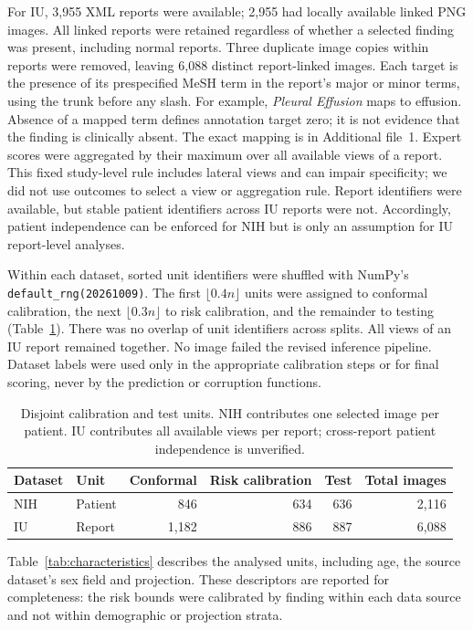\documentclass[10pt,a4paper]{article}
\begin{document}
For IU, 3,955 XML reports were available; 2,955 had locally available linked PNG images. All linked reports were retained regardless of whether a selected finding was present, including normal reports. Three duplicate image copies within reports were removed, leaving 6,088 distinct report-linked images. Each target is the presence of its prespecified MeSH term in the report's major or minor terms, using the trunk before any slash. For example, \emph{Pleural Effusion} maps to effusion. Absence of a mapped term defines annotation target zero; it is not evidence that the finding is clinically absent. The exact mapping is in Additional file~1. Expert scores were aggregated by their maximum over all available views of a report. This fixed study-level rule includes lateral views and can impair specificity; we did not use outcomes to select a view or aggregation rule. Report identifiers were available, but stable patient identifiers across IU reports were not. Accordingly, patient independence can be enforced for NIH but is only an assumption for IU report-level analyses.

Within each dataset, sorted unit identifiers were shuffled with NumPy's \texttt{default\_rng(20261009)}. The first $\lfloor0.4n\rfloor$ units were assigned to conformal calibration, the next $\lfloor0.3n\rfloor$ to risk calibration, and the remainder to testing (Table~\ref{tab:cohort}). There was no overlap of unit identifiers across splits. All views of an IU report remained together. No image failed the revised inference pipeline. Dataset labels were used only in the appropriate calibration steps or for final scoring, never by the prediction or corruption functions.

\begin{table}[htbp]
\centering\small
\caption{Disjoint calibration and test units. NIH contributes one selected image per patient. IU contributes all available views per report; cross-report patient independence is unverified.}\label{tab:cohort}
\begin{tabular}{llrrrr}
\toprule
Dataset & Unit & Conformal & Risk calibration & Test & Total images\\
\midrule
NIH & Patient & 846 & 634 & 636 & 2,116\\
IU & Report & 1,182 & 886 & 887 & 6,088\\
\bottomrule
\end{tabular}
\end{table}

Table~\ref{tab:characteristics} describes the analysed units, including age, the source dataset's sex field and projection. These descriptors are reported for completeness: the risk bounds were calibrated by finding within each data source and not within demographic or projection strata.
\end{document}
